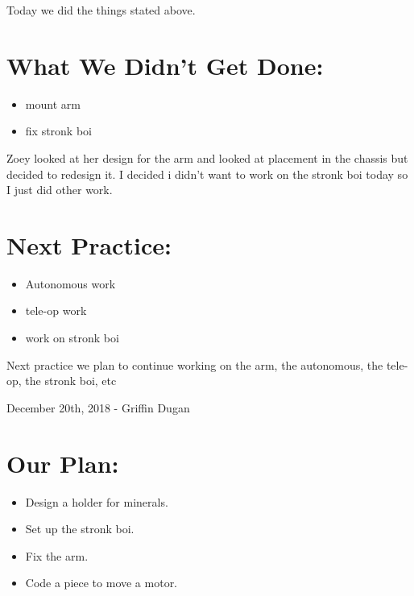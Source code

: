 \documentclass[12pt]{article}
\begin{document}
Today we did the things stated above.

\section{What We Didn't Get Done:} %
\begin{itemize}
	\item mount arm
\item fix stronk boi
\end{itemize}

Zoey looked at her design for the arm and looked at placement in the chassis but decided to redesign it. I decided i didn't want to work on the stronk boi today so I just did other work.

\section{Next Practice:}
\begin{itemize}
	\item Autonomous work
\item tele-op work
\item work on stronk boi
\end{itemize}

Next practice we plan to continue working on the arm, the autonomous, the tele-op, the stronk boi, etc

\newpage
\setcounter{section}{0}

December 20th, 2018 - Griffin Dugan

\section{Our Plan:}
\begin{itemize}
	\item Design a holder for minerals.
	\item Set up the stronk boi.
	\item Fix the arm.
	\item Code a piece to move a motor.
\end{itemize}
\end{document}
